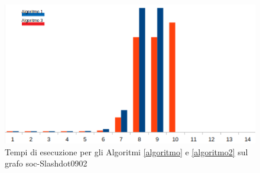 \begin{figure}[htbp]
	\includegraphics[width=15.4cm]{capitolo4/tempiSOC}
	\caption{Tempi di esecuzione per gli Algoritmi \ref{algoritmo} e \ref{algoritmo2} sul grafo soc-Slashdot0902}
	\label{Tempi:4}
\end{figure}

